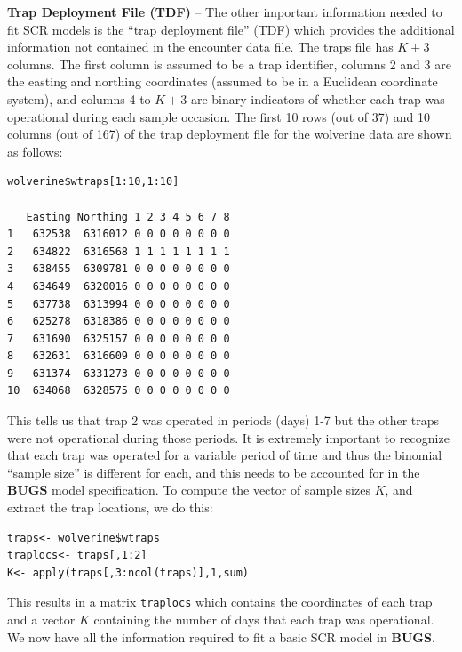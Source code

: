 {\flushleft \bf Trap Deployment File (TDF)} --
The other important information needed to fit SCR models is the ``trap
deployment file'' (TDF)  which provides the additional information not
contained in the encounter data file. The traps file has $K + 3$ columns. The first column is assumed to be a trap
identifier, columns 2 and 3 are the easting and northing coordinates
(assumed to be in a Euclidean coordinate system), and columns 4 to $K + 3$ are binary indicators of whether each trap
was operational during each sample occasion. The first 10 rows (out of 37) and
10 columns (out of 167) of the trap deployment file for the wolverine
data are shown as follows:
{\small
\begin{verbatim}
wolverine$wtraps[1:10,1:10]

   Easting Northing 1 2 3 4 5 6 7 8
1   632538  6316012 0 0 0 0 0 0 0 0
2   634822  6316568 1 1 1 1 1 1 1 1
3   638455  6309781 0 0 0 0 0 0 0 0
4   634649  6320016 0 0 0 0 0 0 0 0
5   637738  6313994 0 0 0 0 0 0 0 0
6   625278  6318386 0 0 0 0 0 0 0 0
7   631690  6325157 0 0 0 0 0 0 0 0
8   632631  6316609 0 0 0 0 0 0 0 0
9   631374  6331273 0 0 0 0 0 0 0 0
10  634068  6328575 0 0 0 0 0 0 0 0
\end{verbatim}
}
This tells us that trap 2 was operated in periods (days) 1-7 but the
other traps were not operational during those periods. It is extremely
important to recognize that each trap was operated for a variable
period of time and thus the binomial ``sample size'' is different for
each, and this needs to be accounted for in the {\bf BUGS} model
specification.  To compute the vector of sample sizes $K$, and extract
the trap locations, we do this:
\begin{verbatim}
traps<- wolverine$wtraps
traplocs<- traps[,1:2]
K<- apply(traps[,3:ncol(traps)],1,sum)
\end{verbatim}
This results in a matrix \mbox{\tt traplocs} which contains the coordinates of
each trap and a vector $K$ containing the number of days that each trap
was operational. We now have all the information required to fit a
basic SCR model in {\bf BUGS}.



